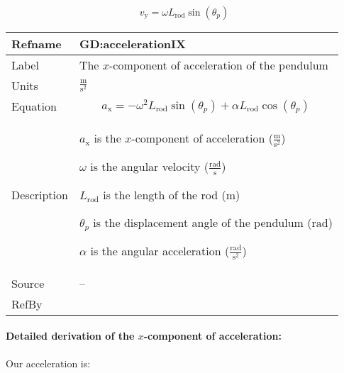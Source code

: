 \documentclass[12pt]{article}
\begin{document}
\begin{displaymath}
{v_{\text{y}}}=ω {L_{\text{rod}}} \sin\left({θ_{p}}\right)
\end{displaymath}
\vspace{\baselineskip}
\noindent
\begin{minipage}{\textwidth}
\begin{tabular}{>{\raggedright}p{}>{\raggedright\arraybackslash}p{}}
\toprule \textbf{Refname} & \textbf{GD:accelerationIX}
\label{GD:accelerationIX}
\\ \midrule
Label & The $x$-component of acceleration of the pendulum
        
\\ \midrule
Units & $\frac{\text{m}}{\text{s}^{2}}$
        
\\ \midrule
Equation & \begin{displaymath}
           {a_{\text{x}}}=-ω^{2} {L_{\text{rod}}} \sin\left({θ_{p}}\right)+α {L_{\text{rod}}} \cos\left({θ_{p}}\right)
           \end{displaymath}
\\ \midrule
Description & \begin{symbDescription}
              \item{${a_{\text{x}}}$ is the $x$-component of acceleration ($\frac{\text{m}}{\text{s}^{2}}$)}
              \item{$ω$ is the angular velocity ($\frac{\text{rad}}{\text{s}}$)}
              \item{${L_{\text{rod}}}$ is the length of the rod (${\text{m}}$)}
              \item{${θ_{p}}$ is the displacement angle of the pendulum (${\text{rad}}$)}
              \item{$α$ is the angular acceleration ($\frac{\text{rad}}{\text{s}^{2}}$)}
              \end{symbDescription}
\\ \midrule
Source & --
         
\\ \midrule
RefBy & 
\\ \bottomrule
\end{tabular}
\end{minipage}
\paragraph{Detailed derivation of the $x$-component of acceleration:}
\label{GD:accelerationIXDeriv}
Our acceleration is:
\end{document}
